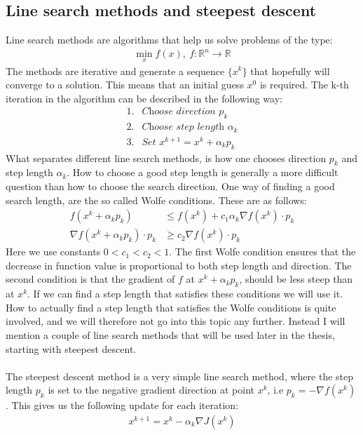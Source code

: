 \subsection{Line search methods and steepest descent}
Line search methods are algorithms that help us solve problems of the type: 
\begin{align*}
\min_x f(x), \ f:\mathbb{R}^n\longrightarrow\mathbb{R}
\end{align*}
The methods are iterative and generate a sequence $\{x^k\}$ that hopefully will converge to a solution. This means that an initial guess $x^0$ is required. The k-th iteration in the algorithm can be described in the following way:
\begin{align*}
1. &\textit{Choose direction $p_k$} \\
2. &\textit{Choose step length $\alpha_k$} \\
3. &\textit{Set $x^{k+1}=x^k + \alpha_kp_k$} 
\end{align*}
What separates different line search methods, is how one chooses direction $p_k$ and step length $\alpha_k$. How to choose a good step length is generally a more difficult question than how to choose the search direction. One way of finding a good search length, are the so called Wolfe conditions. These are as follows:
\begin{align*}
f(x^k + \alpha_kp_k)&\leq f(x^k) + c_1\alpha_k\nabla f(x^k)\cdot p_k \\
\nabla f(x^k + \alpha_kp_k) \cdot p_k &\geq c_2 \nabla f(x^k)\cdot p_k
\end{align*}
Here we use constants $0<c_1<c_2<1$. The first Wolfe condition ensures that the decrease in function value is proportional to both step length and direction. The second condition is that the gradient of $f$ at $x^k + \alpha_kp_k$, should be less steep than at $x^k$. If we can find a step length that satisfies these conditions we will use it. How to actually find a step length that satisfies the Wolfe conditions is quite involved, and we will therefore not go into this topic any further. Instead I will mention a couple of line search methods that will be used later in the thesis, starting with steepest descent.
\\
\\
The steepest descent method is a very simple line search method, where the step length $p_k$ is set to the negative gradient direction at point $x^k$, i.e $p_k = -\nabla f(x^k)$. This gives us the following update for each iteration:
\begin{align*}
x^{k+1} = x^k - \alpha_k \nabla J(x^k)
\end{align*} 
